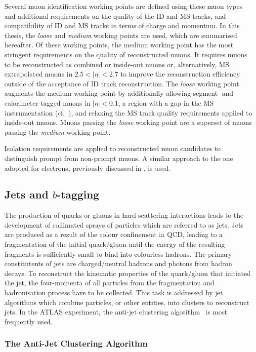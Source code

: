 Several muon identification working points are defined using these muon types
and additional requirements on the quality of the ID and MS tracks, and
compatibility of ID and MS tracks in terms of charge and momentum. In this
thesis, the \emph{loose} and \emph{medium} working points are used, which are
summarised hereafter. Of these working points, the medium working point has the
most stringent requirements on the quality of reconstructed muons. It requires
muons to be reconstructed as combined or inside-out muons or, alternatively, MS
extrapolated muons in $2.5 < |\eta| < 2.7$ to improve the reconstruction
efficiency outside of the acceptance of ID track reconstruction. The
\emph{loose} working point augments the medium working point by additionally
allowing segment- and calorimeter-tagged muons in $|\eta| < 0.1$, a region with
a gap in the MS instrumentation (cf.~), and relaxing the MS
track quality requirements applied to inside-out muons. Muons passing the
\emph{loose} working point are a superset of muons passing the \emph{medium}
working point.

Isolation requirements are applied to reconstructed muon candidates to
distinguish prompt from non-prompt muons. A similar approach to the one adopted
for electrons, previously discussed in , is used.


\subsection{Jets and $b$-tagging}%
\label{sec:jet_rec}

The production of quarks or gluons in hard scattering interactions leads to the
development of collimated sprays of particles which are referred to as
jets. Jets are produced as a result of the colour confinement in QCD, leading to
a fragmentation of the initial quark/gluon until the energy of the resulting
fragments is sufficiently small to bind into colourless hadrons. The primary
constitutents of jets are charged/neutral hadrons and photons from hadron
decays. To reconstruct the kinematic properties of the quark/gluon that
initiated the jet, the four-momenta of all particles from the fragmentation and
hadronisation process have to be collected. This task is addressed by jet
algorithms which combine particles, or other entities, into clusters to
reconstruct jets. In the ATLAS experiment, the anti-\kt jet clustering
algorithm~\cite{Cacciari:2008gp} is most frequently used.


\subsubsection{The Anti-\kt Jet Clustering Algorithm}

